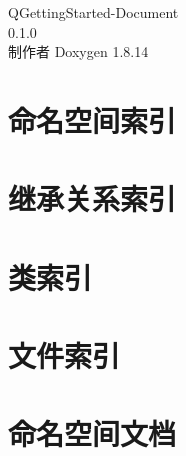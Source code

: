 \documentclass[twoside]{book}
\newcommand{\+}{\discretionary{\mbox{\scriptsize$\hookleftarrow$}}{}{}}
\newcommand{\clearemptydoublepage}{%
  \newpage{\pagestyle{empty}\cleardoublepage}%
}
\begin{document}
\hypersetup{pageanchor=false,
             bookmarksnumbered=true,
             pdfencoding=unicode
            }
\begin{titlepage}
\vspace*{7cm}
\begin{center}%
{\Large Q\+Getting\+Started-\/\+Document \\[1ex]\large 0.\+1.\+0 }\\
\vspace*{1cm}
{\large 制作者 Doxygen 1.8.14}\\
\end{center}
\end{titlepage}
\clearemptydoublepage
{}
\tableofcontents
\clearemptydoublepage
{}
\hypersetup{pageanchor=true}

\chapter{命名空间索引}

\chapter{继承关系索引}

\chapter{类索引}

\chapter{文件索引}

\chapter{命名空间文档}











\end{document}
